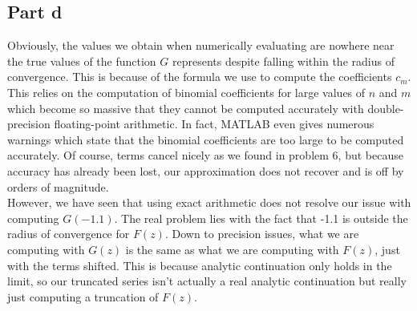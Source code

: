 \documentclass{article}
\begin{document}
\subsection{Part d}
Obviously, the values we obtain when numerically evaluating are nowhere near the true values of the function $G$ represents despite falling within the radius of convergence. This is because of the formula we use to compute the coefficients $c_m$. This relies on the computation of binomial coefficients for large values of $n$ and $m$ which become so massive that they cannot be computed accurately with double-precision floating-point arithmetic. In fact, MATLAB even gives numerous warnings which state that the binomial coefficients are too large to be computed accurately. Of course, terms cancel nicely as we found in problem 6, but because accuracy has already been lost, our approximation does not recover and is off by orders of magnitude. \\
However, we have seen that using exact arithmetic does not resolve our issue with computing $G(-1.1)$. The real problem lies with the fact that -1.1 is outside the radius of convergence for $F(z)$. Down to precision issues, what we are computing with $G(z)$ is the same as what we are computing with $F(z)$, just with the terms shifted. This is because analytic continuation only holds in the limit, so our truncated series isn't actually a real analytic continuation but really just computing a truncation of $F(z)$. %
\end{document}
